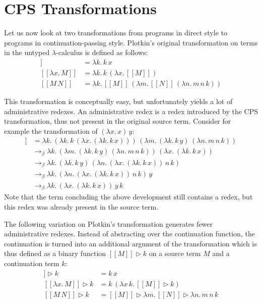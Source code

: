 \documentclass[a4paper,11pt,draft]{article}
\begin{document}
\section{CPS Transformations}\label{sec:transformations}

Let us now look at two transformations from programs in direct style to programs in
continuation-passing style. Plotkin's original transformation on terms in the
untyped $\lambda$-calculus is defined as follows:
\begin{align*}
  [\![x]\!]               &= \lambda k. \, k \, x\\
  [\![\lambda x. \, M]\!] &= \lambda k. \, k \, (\lambda x. \, [\![M]\!])\\
  [\![M \, N]\!]          &= \lambda k. \, [\![M]\!] \, (\lambda m. \, [\![N]\!] \, (\lambda n. \, m \, n \, k))
\end{align*}

This transformation is conceptually easy, but unfortunately yields a lot of
administrative redexes. An administrative redex is a redex introduced by the CPS
transformation, thus not present in the original source term. Consider for example
the transformation of $(\lambda x. \, x) \, y$:
\begin{align*}
  [\![(\lambda x. \, x) \, y]\!] &= \lambda k. \, (\lambda k. \, k \, (\lambda x. \, (\lambda k. \, k \, x))) \, (\lambda m. \, (\lambda k. \, k \, y) \,
 (\lambda n. \, m \, n \, k))\\
                                 &\rightarrow_{\beta} \lambda k. \, (\lambda m. \, (\lambda k. \, k \, y) \, (\lambda n. \, m \, n \, k)) \, (\lambda x.
\, (\lambda k. \, k \, x))\\
                                 &\rightarrow_{\beta} \lambda k. \, (\lambda k. \, k \, y) \, (\lambda n. \, (\lambda x. \, (\lambda k. \, k \, x)) \, n
\, k)\\
                                 &\rightarrow_{\beta} \lambda k. \, (\lambda n. \, (\lambda x. \, (\lambda k. \, k \, x)) \, n \, k) \, y\\
                                 &\rightarrow_{\beta} \lambda k. \, (\lambda x. \, (\lambda k. \, k \, x)) \, y \, k
\end{align*}
Note that the term concluding the above development still contains a redex, but
this redex was already present in the source term.

The following variation on Plotkin's transformation generates fewer
administrative redexes. Instead of abstracting over the continuation function,
the continuation is turned into an additional argument of the transformation which
is thus defined as a binary function $[\![M]\!] \triangleright k$ on a source term
$M$ and a continuation term $k$:
\begin{align*}
  [\![x]\!] \triangleright k               &= k \, x\\
  [\![\lambda x. \, M]\!] \triangleright k &= k \, (\lambda x \, k. \, [\![M]\!] \triangleright k)\\
  [\![M \, N]\!] \triangleright k          &= [\![M]\!] \triangleright \lambda m. \, [\![N]\!] \triangleright \lambda n. \, m \, n \, k
\end{align*}
\end{document}

